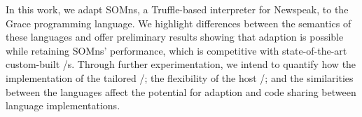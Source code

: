 

%
%
%

% 
%


In this work, we adapt SOMns, a Truffle-based interpreter for Newspeak, to the Grace programming language. We highlight differences between the semantics of these languages and offer preliminary results showing that adaption is possible while retaining SOMns' performance, which is competitive with state-of-the-art custom-built \vm/s. Through further experimentation, we intend to quantify how the implementation of the tailored \vm/; the flexibility of the host \vm/; and the similarities between the languages affect the potential for adaption and code sharing between language implementations.

